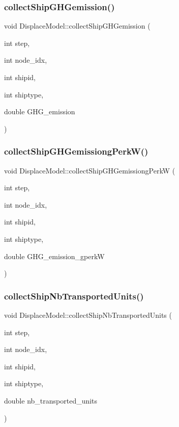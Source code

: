 \subsubsection{\texorpdfstring{collectShipGHGemission()}{collectShipGHGemission()}}
{\footnotesize\ttfamily void Displace\+Model\+::collect\+Ship\+G\+H\+Gemission (\begin{DoxyParamCaption}\item[{int}]{step,  }\item[{int}]{node\+\_\+idx,  }\item[{int}]{shipid,  }\item[{int}]{shiptype,  }\item[{double}]{G\+H\+G\+\_\+emission }\end{DoxyParamCaption})}

\mbox{\label{class_displace_model_a366db1ea6d9cbe63c54b9adf13039dee}} 
\subsubsection{\texorpdfstring{collectShipGHGemissiongPerkW()}{collectShipGHGemissiongPerkW()}}
{\footnotesize\ttfamily void Displace\+Model\+::collect\+Ship\+G\+H\+Gemissiong\+PerkW (\begin{DoxyParamCaption}\item[{int}]{step,  }\item[{int}]{node\+\_\+idx,  }\item[{int}]{shipid,  }\item[{int}]{shiptype,  }\item[{double}]{G\+H\+G\+\_\+emission\+\_\+gperkW }\end{DoxyParamCaption})}

\mbox{\label{class_displace_model_a45f39a3bef5550b551090b0247f953d4}} 
\subsubsection{\texorpdfstring{collectShipNbTransportedUnits()}{collectShipNbTransportedUnits()}}
{\footnotesize\ttfamily void Displace\+Model\+::collect\+Ship\+Nb\+Transported\+Units (\begin{DoxyParamCaption}\item[{int}]{step,  }\item[{int}]{node\+\_\+idx,  }\item[{int}]{shipid,  }\item[{int}]{shiptype,  }\item[{double}]{nb\+\_\+transported\+\_\+units }\end{DoxyParamCaption})}

